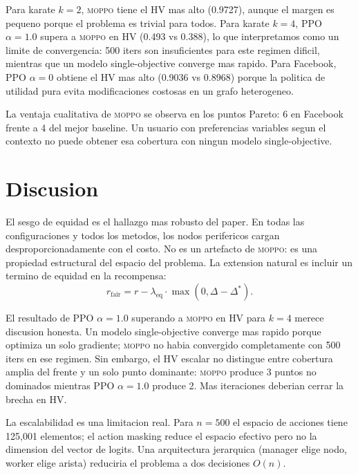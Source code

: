 \documentclass[10pt,twocolumn,letterpaper]{article}
\newcommand{\moppo}{\textsc{moppo}}
\newcommand{\HV}{\text{HV}}
\newcommand{\Ddelta}{\Delta}
\begin{document}
Para karate $k=2$, \moppo{} tiene el $\HV$ mas alto (0.9727), aunque el margen es
pequeno porque el problema es trivial para todos. Para karate $k=4$, PPO $\alpha=1.0$
supera a \moppo{} en $\HV$ (0.493 vs 0.388), lo que interpretamos como un limite de
convergencia: 500 iters son insuficientes para este regimen dificil, mientras que un
modelo single-objective converge mas rapido. Para Facebook, PPO $\alpha=0$ obtiene el
$\HV$ mas alto (0.9036 vs 0.8968) porque la politica de utilidad pura evita
modificaciones costosas en un grafo heterogeneo.

La ventaja cualitativa de \moppo{} se observa en los puntos Pareto: 6 en Facebook
frente a 4 del mejor baseline. Un usuario con preferencias variables segun el contexto
no puede obtener esa cobertura con ningun modelo single-objective.

\section{Discusion}

El sesgo de equidad es el hallazgo mas robusto del paper. En todas las configuraciones
y todos los metodos, los nodos perifericos cargan desproporcionadamente con el costo.
No es un artefacto de \moppo{}: es una propiedad estructural del espacio del problema.
La extension natural es incluir un termino de equidad en la recompensa:
\begin{equation}
  r_{\text{fair}} = r - \lambda_{\text{eq}}\cdot\max(0, \Ddelta - \Ddelta^*).
\end{equation}

El resultado de PPO $\alpha=1.0$ superando a \moppo{} en $\HV$ para $k=4$ merece
discusion honesta. Un modelo single-objective converge mas rapido porque optimiza un
solo gradiente; \moppo{} no habia convergido completamente con 500 iters en ese
regimen. Sin embargo, el $\HV$ escalar no distingue entre cobertura amplia del frente
y un solo punto dominante: \moppo{} produce 3 puntos no dominados mientras PPO
$\alpha=1.0$ produce 2. Mas iteraciones deberian cerrar la brecha en $\HV$.

La escalabilidad es una limitacion real. Para $n=500$ el espacio de acciones tiene
125{,}001 elementos; el action masking reduce el espacio efectivo pero no la dimension
del vector de logits. Una arquitectura jerarquica (manager elige nodo, worker elige
arista) reduciria el problema a dos decisiones $O(n)$.
\end{document}
